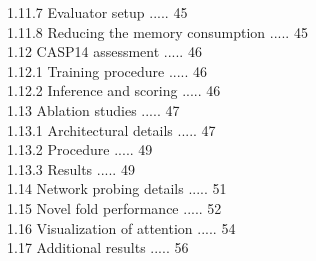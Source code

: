 \documentclass[10pt]{article}
\begin{document}
1.11.7 Evaluator setup ..... 45\\
1.11.8 Reducing the memory consumption ..... 45\\
1.12 CASP14 assessment ..... 46\\
1.12.1 Training procedure ..... 46\\
1.12.2 Inference and scoring ..... 46\\
1.13 Ablation studies ..... 47\\
1.13.1 Architectural details ..... 47\\
1.13.2 Procedure ..... 49\\
1.13.3 Results ..... 49\\
1.14 Network probing details ..... 51\\
1.15 Novel fold performance ..... 52\\
1.16 Visualization of attention ..... 54\\
1.17 Additional results ..... 56
\end{document}
